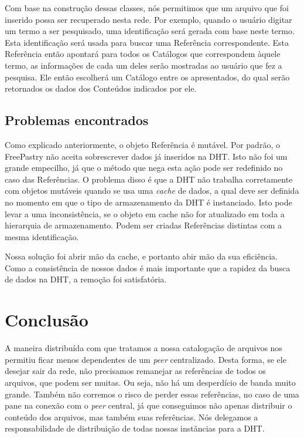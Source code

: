 \documentclass{acm_proc_article-sp}
\begin{document}
Com base na construção dessas classes, nós permitimos que um arquivo que foi inserido possa ser recuperado nesta rede. Por exemplo, quando o usuário digitar um termo a ser pesquisado, uma identificação será gerada com base neste termo. Esta identificação será usada para buscar uma Referência correspondente. Esta Referência então apontará para todos os Catálogos que correspondem àquele termo, as informações de cada um deles serão mostradas ao usuário que fez a pesquisa. Ele então escolherá um Catálogo entre os apresentados, do qual serão retornados os dados dos Conteúdos indicados por ele. 

\subsection{Problemas encontrados}

Como explicado anteriormente, o objeto Referência é mutável. Por padrão, o FreePastry não aceita sobrescrever dados já inseridos na DHT. Isto não foi um grande empecilho, já que o método que nega esta ação pode ser redefinido no caso das Referências. O problema disso é que a DHT não trabalha corretamente com objetos mutáveis quando se usa uma \textit{cache} de dados, a qual deve ser definida no momento em que o tipo de armazenamento da DHT é instanciado. Isto pode levar a uma inconsistência, se o objeto em cache não for atualizado em toda a hierarquia de armazenamento. Podem ser criadas Referências distintas com a mesma identificação.

Nossa solução foi abrir mão da cache, e portanto abir mão da sua eficiência. Como a consistência de nossos dados é mais importante que a rapidez da busca de dados na DHT, a remoção foi satisfatória.

\section{Conclusão}

A maneira distribuída com que tratamos a nossa catalogação de arquivos nos permitiu ficar menos dependentes de um \textit{peer} centralizado. Desta forma, se ele desejar sair da rede, não precisamos remanejar as referências de todos os arquivos, que podem ser muitas. Ou seja, não há um desperdício de banda muito grande. Também não corremos o risco de perder essas referências, no caso de uma pane na conexão com o \textit{peer} central, já que conseguimos não apenas distribuir o conteúdo dos arquivos, mas também suas referências. Nós delegamos a responsabilidade de distribuição de todas nossas instâncias para a DHT.
\end{document}
